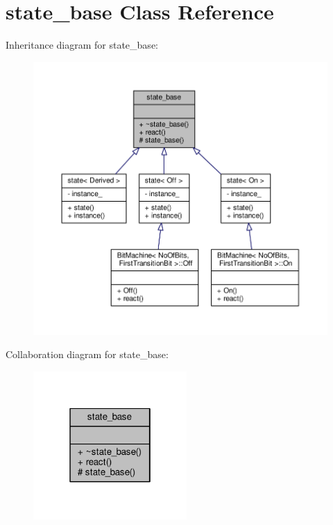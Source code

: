 \hypertarget{classstate__base}{}\section{state\+\_\+base Class Reference}
\label{classstate__base}


Inheritance diagram for state\+\_\+base\+:
\nopagebreak
\begin{figure}[H]
\begin{center}
\leavevmode
\includegraphics[width=350pt]{classstate__base__inherit__graph}
\end{center}
\end{figure}


Collaboration diagram for state\+\_\+base\+:
\nopagebreak
\begin{figure}[H]
\begin{center}
\leavevmode
\includegraphics[width=166pt]{classstate__base__coll__graph}
\end{center}
\end{figure}

